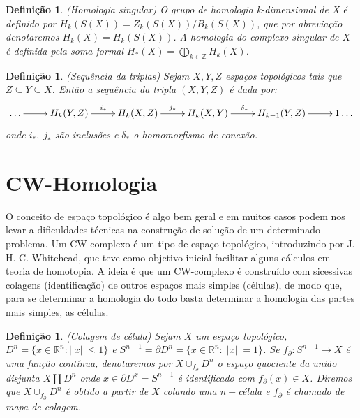 \documentclass[12pt]{book}
\newtheorem{definicao}[teorema]{Definição}
\newcommand{\homologiarel}[3]{H_{#1}(#2,#3)}
\begin{document}
	\begin{definicao}
		(Homologia singular) O grupo de homologia k-dimensional de X é definido por $H_{k}(S(X)) = Z_{k}(S(X))/B_{k}(S(X))$, que por abreviação denotaremos $H_{k}(X)=H_{k}(S(X))$. A homologia do complexo singular de $X$ é definida pela soma formal $H_{*}(X) = \bigoplus_{k \in \mathbb{Z}}H_{k}(X)$.
	\end{definicao}
	
	\begin{definicao}
		(Sequência da triplas) Sejam $X, Y, Z$ espaços topológicos tais que $Z \subseteq Y \subseteq X$. Então a sequência da tripla $(X,Y,Z)$ é dada por:
		$$
		\xymatrix{
				\dots \ar[r] & \homologiarel{k}{Y}{Z} \ar[r]^{i_{*}} & \homologiarel{k}{X}{Z} \ar[r]^{j_{*}} & \homologiarel{k}{X}{Y} \ar[r]^{\delta_{*}} & \homologiarel{k-1}{Y}{Z} \ar[r] & 1\dots
		}
		$$
		onde $i_{*},\;j_{*}$ são inclusões e $\delta_{*}$ o homomorfismo de conexão.
	\end{definicao}
	
	\section{CW-Homologia}
	O conceito de espaço topológico é algo bem geral e em muitos casos podem nos levar a dificuldades técnicas na construção de solução de um determinado problema. Um CW-complexo é um tipo de espaço topológico, introduzindo por J. H. C. Whitehead, que teve como objetivo inicial facilitar alguns cálculos em teoria de homotopia. A ideia é que um CW-complexo é construído com sicessivas colagens (identificação) de outros espaços mais simples (células), de modo que, para se determinar a homologia do todo basta determinar a homologia das partes mais simples, as células.
	\begin{definicao}
		(Colagem de célula) Sejam $X$ um espaço topológico, $D^{n}=\{x\in \mathbb{R}^{n} : ||x|| \leq 1\}$ e $S^{n-1} = \partial D^{n}=\{x\in \mathbb{R}^{n} : ||x|| = 1\}$. Se $f_{\partial}:S^{n-1} \to X$ é uma função contínua, denotaremos por $X\cup_{f_{\partial}}D^{n}$ o espaço quociente da união disjunta $X \coprod D^{n}$ onde $x \in \partial D^{x} = S^{n-1}$ é identificado com $f_{\partial}(x) \in X$. Diremos que $X\cup_{f_{\partial}}D^{n}$ é obtido a partir de $X$ colando uma $n-$célula e $f_{\partial}$ é chamado de mapa de colagem.
 	\end{definicao}
	
\end{document}
